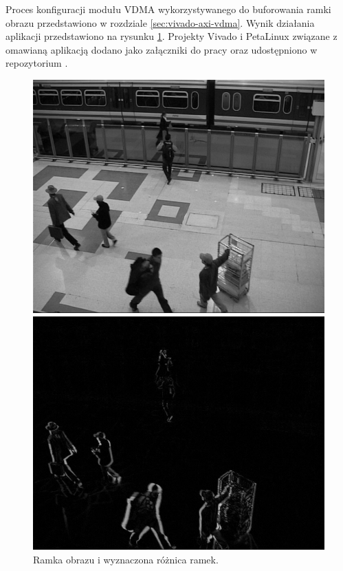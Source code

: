 Proces konfiguracji modułu VDMA wykorzystywanego do buforowania ramki obrazu przedstawiono w rozdziale \ref{sec:vivado-axi-vdma}.
Wynik działania aplikacji przedstawiono na rysunku \ref{fig:frame-difference-result}. Projekty Vivado i PetaLinux związane z omawianą aplikacją dodano jako załączniki do pracy oraz udostępniono w repozytorium \cite{git-repository}.
\begin{figure}[H]
	\centering
	\begin{minipage}[b]{0.49\textwidth}
		\includegraphics[width=\textwidth]{img/fd-frame.png}
	\end{minipage}
	\hfill
	\begin{minipage}[b]{0.49\textwidth}
		\includegraphics[width=\textwidth]{img/fd-diff.png}
	\end{minipage}
	\caption{Ramka obrazu i wyznaczona różnica ramek.}
	\label{fig:frame-difference-result}
\end{figure}
